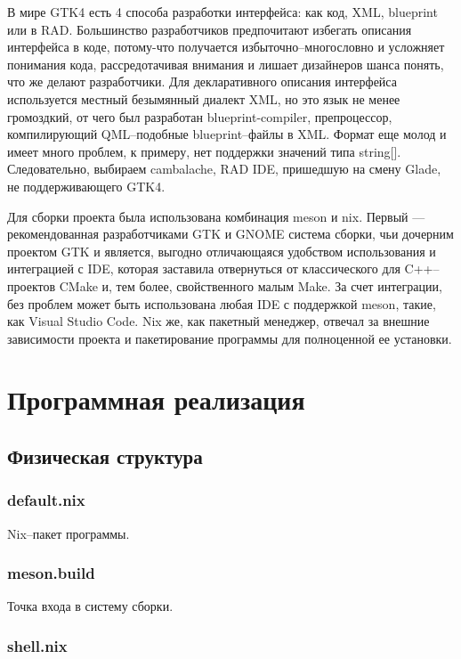 \documentclass[variant=courcework]{bsuir}
\begin{document}
В мире GTK4 есть 4 способа разработки интерфейса: как код, XML, blueprint или в
RAD. Большинство разработчиков предпочитают избегать описания интерфейса в коде,
потому-что получается избыточно--многословно и усложняет понимания кода,
рассредотачивая внимания и лишает дизайнеров шанса понять, что же делают
разработчики. Для декларативного описания интерфейса используется местный
безымянный диалект XML, но это язык не менее громоздкий, от чего был разработан
blueprint-compiler, препроцессор, компилирующий QML--подобные blueprint--файлы в
XML. Формат еще молод и имеет много проблем, к примеру, нет поддержки значений
типа string[]. Следовательно, выбираем cambalache, RAD IDE, пришедшую на смену
Glade, не поддерживающего GTK4.

Для сборки проекта была использована комбинация meson и nix. Первый ---
рекомендованная разработчиками GTK и GNOME система сборки, чьи дочерним проектом
GTK и является, выгодно отличающаяся удобством использования и интеграцией с
IDE, которая заставила отвернуться от классического для C++--проектов CMake и,
тем более, свойственного малым Make. За счет интеграции, без проблем может быть
использована любая IDE с поддержкой meson, такие, как Visual Studio Code. Nix
же, как пакетный менеджер, отвечал за внешние зависимости проекта и
пакетирование программы для полноценной ее установки.

\chapter{Программная реализация}

\section{Физическая структура}

\subsection*{default.nix}

Nix--пакет программы.

\subsection{meson.build}

Точка входа в систему сборки.

\subsection{shell.nix}
\end{document}
